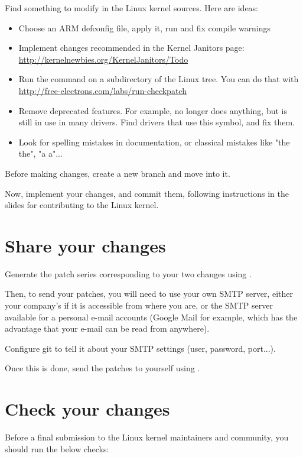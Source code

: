 Find something to modify in the Linux kernel sources. Here are ideas:

\begin{itemize}
\item Choose an ARM defconfig file, apply it, run  and fix compile warnings
\item Implement changes recommended in the Kernel Janitors page: \url{http://kernelnewbies.org/KernelJanitors/Todo}
\item Run the  command on a subdirectory of the Linux tree.
      You can do that with \url{http://free-electrons.com/labs/run-checkpatch}
\item Remove deprecated features. For example,  no longer does anything,
      but is still in use in many drivers. Find drivers that use this symbol, and fix them.
\item Look for spelling mistakes in documentation, or classical mistakes like "the the", "a a"...
\end{itemize}

Before making changes, create a new branch and move into it.

Now, implement your changes, and commit them, following instructions 
in the slides for contributing to the Linux kernel.

\section{Share your changes}

Generate the patch series corresponding to your two changes using
.

Then, to send your patches, you will need to use your own SMTP server, either your company's
if it is accessible from where you are, or the SMTP server available for a personal e-mail 
accounts (Google Mail for example, which has the advantage that your e-mail can be read
from anywhere). 

Configure git to tell it about your SMTP settings (user, password, port...).

Once this is done, send the patches to yourself using .

\section{Check your changes}

Before a final submission to the Linux kernel maintainers and community, you 
should run the below checks:

